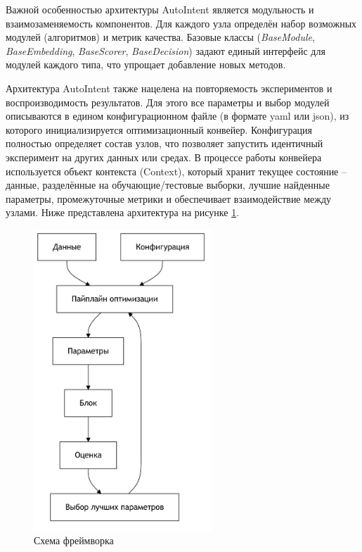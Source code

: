\documentclass[14pt,a4paper,oneside,openany]{extbook}
\begin{document}
Важной особенностью архитектуры AutoIntent является модульность и взаимозаменяемость компонентов. Для каждого узла определён набор возможных модулей (алгоритмов) и метрик качества. Базовые классы (\emph{BaseModule}, \emph{BaseEmbedding}, \emph{BaseScorer}, \emph{BaseDecision}) задают единый интерфейс для модулей каждого типа, что упрощает добавление новых методов.

Архитектура AutoIntent также нацелена на повторяемость экспериментов и воспроизводимость результатов. Для этого все параметры и выбор модулей описываются в едином конфигурационном файле (в формате yaml или json), из которого инициализируется оптимизационный конвейер. Конфигурация полностью определяет состав узлов, что позволяет запустить идентичный эксперимент на других данных или средах. В процессе работы конвейера используется объект контекста (Context), который хранит текущее состояние – данные, разделённые на обучающие/тестовые выборки, лучшие найденные параметры, промежуточные метрики и обеспечивает взаимодействие между узлами. Ниже представлена архитектура на рисунке \ref{fig:framework_schema}.

\begin{figure}[h]
\centering
\includegraphics[width=0.6\textwidth,height=0.5\textheight]{img/mermaid/framework_schema.png}
\caption{\label{fig:framework_schema}Схема фреймворка}
\end{figure}
\end{document}
